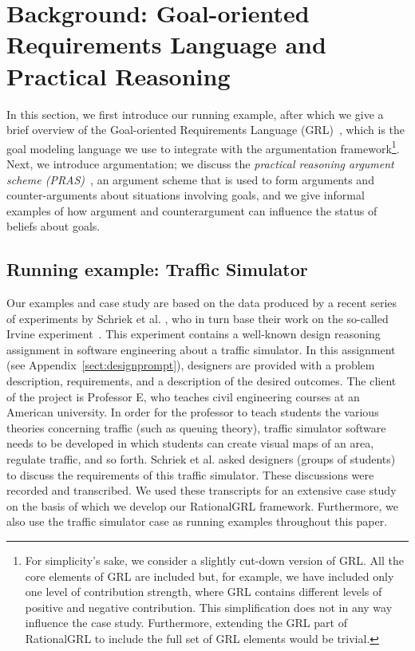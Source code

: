 \section{Background: Goal-oriented Requirements Language and Practical Reasoning}
\label{sect:background}

In this section, we first introduce our running example, after which we give a brief overview of the Goal-oriented Requirements Language (GRL)~\cite{Amyot:2010:EGM:1841349.1841356}, which is the goal modeling language we use to integrate with the argumentation framework\footnote{For simplicity's sake, we consider a slightly cut-down version of GRL. All the core elements of GRL are included but, for example, we have included only one level of contribution strength, where GRL contains different levels of positive and negative contribution. This simplification does not in any way influence the case study. Furthermore, extending the GRL part of RationalGRL to include the full set of GRL elements would be trivial.}. Next, we introduce argumentation; we discuss the \emph{practical reasoning argument scheme (PRAS)}~\cite{atkinson2007}, an argument scheme that is used to form arguments and counter-arguments about situations involving goals, and we give informal examples of how argument and counterargument can influence the status of beliefs about goals.   %

\subsection{Running example: Traffic Simulator}
\label{sect:goals:runningexample}

Our examples and case study are based on the data produced by a recent series of experiments by Schriek et al. \cite{SchriekEtal2016}, who in turn base their work on the so-called Irvine experiment~\cite{UCIworkshop}. This experiment contains a well-known design reasoning assignment in software engineering about a traffic simulator. In this assignment (see Appendix~\ref{sect:designprompt}), designers are provided with a problem description, requirements, and a description of the desired outcomes. The client of the project is Professor E, who teaches civil engineering courses at an American university. In order for the professor to teach students the various theories concerning traffic (such as queuing theory), traffic simulator software needs to be developed in which students can create visual maps of an area, regulate traffic, and so forth. Schriek et al. asked designers (groups of students) to discuss the requirements of this traffic simulator. These discussions were recorded and transcribed. We used these transcripts for an extensive case study on the basis of which we develop our RationalGRL framework. Furthermore, we also use the traffic simulator case as running examples throughout this paper. 

